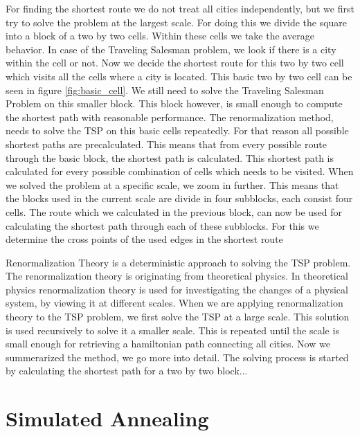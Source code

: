 For finding the shortest route we do not treat all cities independently, but we first try to solve the problem at the largest scale. For doing this we divide the square into a block of a two by two cells. Within these cells we take the average behavior. In case of the Traveling Salesman problem, we look if there is a city within the cell or not. Now we decide the shortest route for this two by two cell which visits all the cells where a city is located.
\newline\newline\noindent
This basic two by two cell can be seen in figure \ref{fig:basic_cell}. We still need to solve the Traveling Salesman Problem on this smaller block. This block however, is small enough to compute the shortest path with reasonable performance. The renormalization method, needs to solve the TSP on this basic cells repeatedly. For that reason all possible shortest paths are precalculated. This means that from every possible route through the basic block, the shortest path is calculated. This shortest path is calculated for every possible combination of cells which needs to be visited.
\newline\newline\noindent
When we solved the problem at a specific scale, we zoom in further. This means that the blocks used in the current scale are divide in four subblocks, each consist four cells. The route which we calculated in the previous block, can now be used for calculating the shortest path through each of these subblocks. For this we determine the cross points of the used edges in the shortest route




Renormalization Theory is a deterministic approach to solving the TSP problem. The renormalization theory is originating from theoretical physics. In theoretical physics renormalization theory is used for investigating the changes of a physical system, by viewing it at different scales.
\newline\newline\noindent
When we are applying renormalization theory to the TSP problem, we first solve the TSP at a large scale. This solution is used recursively to solve it a smaller scale. This is repeated until the scale is small enough for retrieving a hamiltonian path connecting all cities.
\newline\newline\noindent
Now we summerarized the method, we go more into detail. The solving process is started by calculating the shortest path for a two by two block...
\section{Simulated Annealing}


